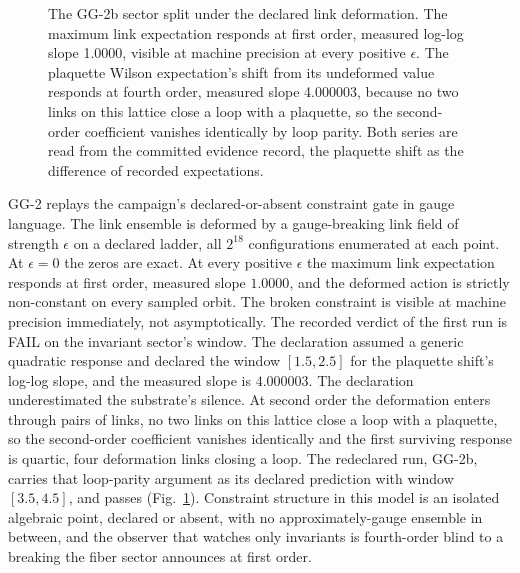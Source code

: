 \documentclass[aps,pre,reprint,nofootinbib,floatfix]{revtex4-2}
\begin{document}
\begin{figure}[t]
\centering
{}
\caption{The GG-2b sector split under the declared link
deformation.  The maximum link expectation responds at first order,
measured log-log slope 1.0000, visible at machine precision at
every positive $\epsilon$.  The plaquette Wilson expectation's
shift from its undeformed value responds at fourth order, measured
slope 4.000003, because no two links on this lattice close a loop
with a plaquette, so the second-order coefficient vanishes
identically by loop parity.  Both series are read from the
committed evidence record, the plaquette shift as the difference
of recorded expectations.}
\label{fig:gg}
\end{figure}

GG-2 replays the campaign's declared-or-absent constraint gate in
gauge language.  The link ensemble is deformed by a gauge-breaking
link field of strength $\epsilon$ on a declared ladder, all
$2^{18}$ configurations enumerated at each point.  At $\epsilon=0$
the zeros are exact.  At every positive $\epsilon$ the maximum link
expectation responds at first order, measured slope $1.0000$, and
the deformed action is strictly non-constant on every sampled
orbit.  The broken constraint is visible at machine precision
immediately, not asymptotically.  The recorded verdict of the first
run is FAIL on the invariant sector's window.  The declaration
assumed a generic quadratic response and declared the window
$[1.5, 2.5]$ for the plaquette shift's log-log slope, and the
measured slope is $4.000003$.  The declaration underestimated the
substrate's silence.  At second order the deformation enters
through pairs of links, no two links on this lattice close a loop
with a plaquette, so the second-order coefficient vanishes
identically and the first surviving response is quartic, four
deformation links closing a loop.  The redeclared run, GG-2b,
carries that loop-parity argument as its declared prediction with
window $[3.5, 4.5]$, and passes (Fig.~\ref{fig:gg}).  Constraint
structure in this model is an isolated algebraic point, declared or
absent, with no approximately-gauge ensemble in between, and the
observer that watches only invariants is fourth-order blind to a
breaking the fiber sector announces at first order.
\end{document}
